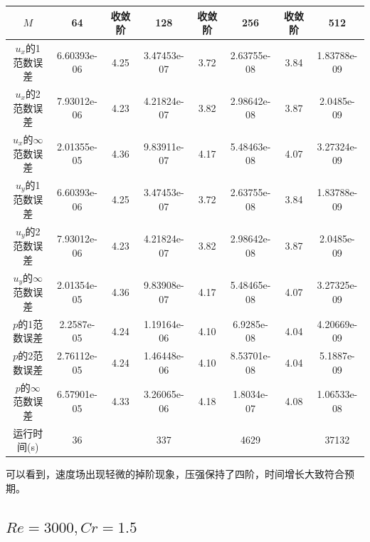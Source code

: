 \documentclass[lang=cn,10pt,bibend=bibtex]{elegantbook}
\begin{document}
\begin{table}[H]
  \centering
  \small
  \begin{tabular}{c|ccccccc}
  \textbf{$M$}              & 64          & 收敛阶 & 128         & 收敛阶 & 256         & 收敛阶 & 512   \\ \hline
  $u_x$的1范数误差 & 6.60393e-06 & 4.25 & 3.47453e-07 & 3.72 & 2.63755e-08 & 3.84 & 1.83788e-09\\
  $u_x$的2范数误差 & 7.93012e-06 & 4.23 & 4.21824e-07 & 3.82 & 2.98642e-08 & 3.87 & 2.0485e-09\\
  $u_x$的$\infty$范数误差 & 2.01355e-05 & 4.36 & 9.83911e-07 & 4.17 & 5.48463e-08 & 4.07 & 3.27324e-09\\
  $u_y$的1范数误差 & 6.60393e-06 & 4.25 & 3.47453e-07 & 3.72 & 2.63755e-08 & 3.84 & 1.83788e-09\\
  $u_y$的2范数误差 & 7.93012e-06 & 4.23 & 4.21824e-07 & 3.82 & 2.98642e-08 & 3.87 & 2.0485e-09\\
  $u_y$的$\infty$范数误差 & 2.01354e-05 & 4.36 & 9.83908e-07 & 4.17 & 5.48465e-08 & 4.07 & 3.27325e-09\\
  $p$的1范数误差 & 2.2587e-05 & 4.24 & 1.19164e-06 & 4.10 & 6.9285e-08 & 4.04 & 4.20669e-09\\
  $p$的2范数误差 & 2.76112e-05 & 4.24 & 1.46448e-06 & 4.10 & 8.53701e-08 & 4.04 & 5.1887e-09\\  
  $p$的$\infty$范数误差 & 6.57901e-05 & 4.33 & 3.26065e-06 & 4.18 & 1.8034e-07 & 4.08 & 1.06533e-08\\
  运行时间(s)                &      36      &       &      337     &       &     4629     &       &   37132
  \end{tabular}
\end{table}

可以看到，速度场出现轻微的掉阶现象，压强保持了四阶，时间增长大致符合预期。

\subsection{$Re=3000,Cr=1.5$}
\end{document}
